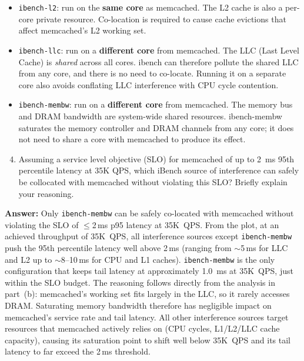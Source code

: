 \begin{enumerate}[label=(\alph*)]
\begin{itemize}
\begin{itemize}
            \item \texttt{ibench-l2}: run on the \textbf{same core} as memcached.
            The L2 cache is also a per-core private resource. Co-location is required
            to cause cache evictions that affect memcached's L2 working set.

            \item \texttt{ibench-llc}: run on a \textbf{different core} from
            memcached. The LLC (Last Level Cache) is \emph{shared} across all cores.
            ibench can therefore pollute the shared LLC from any core, and there is no
            need to co-locate. Running it on a separate core also avoids conflating
            LLC interference with CPU cycle contention.

            \item \texttt{ibench-membw}: run on a \textbf{different core} from
            memcached. The memory bus and DRAM bandwidth are system-wide shared
            resources. ibench-membw saturates the memory controller and DRAM channels
            from any core; it does not need to share a core with memcached to produce
            its effect.
             \end{itemize}
    \end{itemize}
    
\end{enumerate}

    
\begin{enumerate}[label=(\alph*)]
    \setcounter{enumi}{3}
    
    \item Assuming a service level objective (SLO) for memcached of up to 2~ms 95th percentile latency at 35K QPS, which iBench source of interference can safely be collocated with memcached without violating this SLO? Briefly explain your reasoning.
            
\end{enumerate}

\textbf{Answer:}
Only \texttt{ibench-membw} can be safely co-located with memcached without violating the SLO of $\leq$2\,ms p95 latency at 35K~QPS.
From the plot, at an achieved throughput of 35K~QPS, all interference sources except \texttt{ibench-membw} push the 95th percentile latency well above 2\,ms (ranging from $\sim$5\,ms for LLC and L2 up to $\sim$8--10\,ms for CPU and L1
caches). \texttt{ibench-membw} is the only configuration that keeps tail latency at approximately 1.0 \,ms at 35K~QPS, just within the SLO budget.
The reasoning follows directly from the analysis in part~(b): memcached's working set fits largely in the LLC, so it rarely accesses DRAM. Saturating memory bandwidth therefore has negligible impact on memcached's service rate and tail latency. All other interference sources target resources that memcached actively relies on (CPU cycles, L1/L2/LLC cache capacity), causing its saturation point to
shift well below 35K~QPS and its tail latency to far exceed the 2\,ms threshold.

